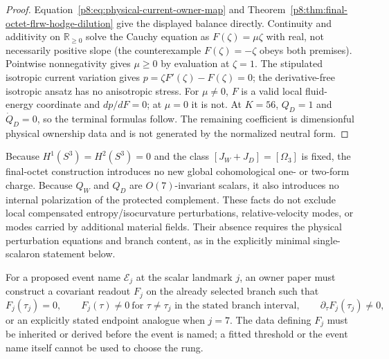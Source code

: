 \documentclass[12pt,a4paper]{article}
\begin{document}
\begin{proof}
Equation~\eqref{p8:eq:physical-current-owner-map} and
Theorem~\ref{p8:thm:final-octet-flrw-hodge-dilution} give the displayed
balance directly.  Continuity and additivity on \(\mathbb R_{\geq0}\) solve
the Cauchy equation as \(F(\zeta)=\mu\zeta\) with real, not necessarily
positive slope (the counterexample \(F(\zeta)=-\zeta\) obeys both premises).
Pointwise nonnegativity gives \(\mu\geq0\) by evaluation at
\(\zeta=1\). The stipulated isotropic current variation gives
\(p=\zeta F'(\zeta)-F(\zeta)=0\); the derivative-free isotropic ansatz
has no anisotropic stress. For \(\mu\ne0\), \(F\) is a valid local
fluid-energy coordinate and \(dp/dF=0\); at \(\mu=0\) it is not.  At \(K=56\),
\(Q_D=1\) and \(\dot Q_D=0\), so the terminal formulas follow.  The remaining
coefficient is dimensionful physical ownership data and is not generated by
the normalized neutral form.
\end{proof}

\begin{remark}
\label{p8:rem:k48-isocurvature-scope}
Because $H^1(S^3)=H^2(S^3)=0$ and the class
$[J_W+J_D]=[\Omega_3]$ is fixed, the final-octet construction introduces no
new global cohomological one- or two-form charge.  Because $Q_W$ and $Q_D$ are
$O(7)$-invariant scalars, it also introduces no internal polarization of the
protected complement.  These facts do not exclude local compensated
entropy/isocurvature perturbations, relative-velocity modes, or modes carried
by additional material fields.  Their absence requires the physical
perturbation equations and branch content, as in the explicitly minimal
single-scalaron statement below.
\end{remark}

\begin{definition}
\label{p8:def:typed-hierarchy-event-predicate}
For a proposed event name \(\mathcal E_j\) at the scalar landmark \(j\), an
owner paper must construct a covariant readout \(F_j\) on the already selected
branch such that
\begin{equation}
\label{p8:eq:typed-event-predicate}
 F_j(\tau_j)=0,
 \qquad
 F_j(\tau)\ne0\ \text{for }\tau\ne\tau_j
 \text{ in the stated branch interval},
 \qquad
 \partial_\tau F_j(\tau_j)\ne0,
\end{equation}
or an explicitly stated endpoint analogue when \(j=7\).  The data defining
\(F_j\) must be inherited or derived before the event is named; a fitted
threshold or the event name itself cannot be used to choose the rung.
\end{definition}
\end{document}
